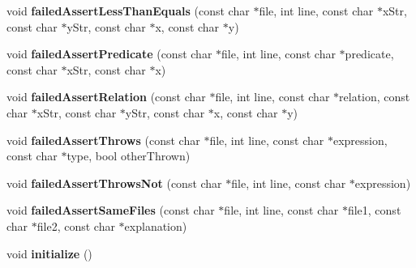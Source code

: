 \begin{DoxyCompactItemize}
\item 
\hypertarget{classCxxTest_1_1TestTracker_aafdc299146069e88d8939fc242b65c7d}{void {\bfseries failed\-Assert\-Less\-Than\-Equals} (const char $\ast$file, int line, const char $\ast$x\-Str, const char $\ast$y\-Str, const char $\ast$x, const char $\ast$y)}\label{classCxxTest_1_1TestTracker_aafdc299146069e88d8939fc242b65c7d}

\item 
\hypertarget{classCxxTest_1_1TestTracker_a4147739b8e6f139e4defb313888f80b1}{void {\bfseries failed\-Assert\-Predicate} (const char $\ast$file, int line, const char $\ast$predicate, const char $\ast$x\-Str, const char $\ast$x)}\label{classCxxTest_1_1TestTracker_a4147739b8e6f139e4defb313888f80b1}

\item 
\hypertarget{classCxxTest_1_1TestTracker_a16d41deb6d92bffc2280e782b18af4ab}{void {\bfseries failed\-Assert\-Relation} (const char $\ast$file, int line, const char $\ast$relation, const char $\ast$x\-Str, const char $\ast$y\-Str, const char $\ast$x, const char $\ast$y)}\label{classCxxTest_1_1TestTracker_a16d41deb6d92bffc2280e782b18af4ab}

\item 
\hypertarget{classCxxTest_1_1TestTracker_aa35879a5d8b44522d111f9ea570286a7}{void {\bfseries failed\-Assert\-Throws} (const char $\ast$file, int line, const char $\ast$expression, const char $\ast$type, bool other\-Thrown)}\label{classCxxTest_1_1TestTracker_aa35879a5d8b44522d111f9ea570286a7}

\item 
\hypertarget{classCxxTest_1_1TestTracker_a02976c462f57c0bf557e5611749d6056}{void {\bfseries failed\-Assert\-Throws\-Not} (const char $\ast$file, int line, const char $\ast$expression)}\label{classCxxTest_1_1TestTracker_a02976c462f57c0bf557e5611749d6056}

\item 
\hypertarget{classCxxTest_1_1TestTracker_a175b640bc0020230cb576ee64fce56ee}{void {\bfseries failed\-Assert\-Same\-Files} (const char $\ast$file, int line, const char $\ast$file1, const char $\ast$file2, const char $\ast$explanation)}\label{classCxxTest_1_1TestTracker_a175b640bc0020230cb576ee64fce56ee}

\item 
\hypertarget{classCxxTest_1_1TestTracker_aa8d865e700f7e73a9506b86f0940e607}{void {\bfseries initialize} ()}\label{classCxxTest_1_1TestTracker_aa8d865e700f7e73a9506b86f0940e607}

\end{DoxyCompactItemize}
